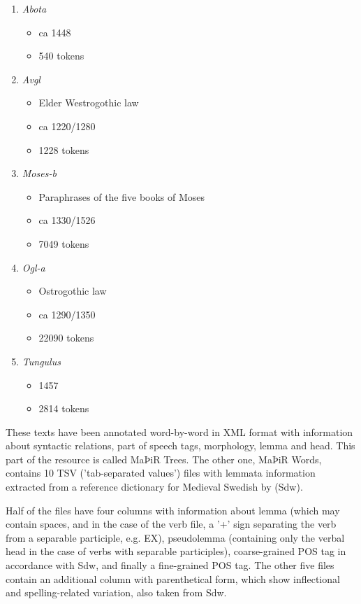 \documentclass[11pt,a4paper]{article}
\begin{document}
\begin{enumerate}
   \item \emph{Abota}
   \begin{itemize}
     \item ca 1448
     \item 540 tokens
   \end{itemize}
   \item \emph{Avgl} 
     \begin{itemize}
     \item Elder Westrogothic law
     \item ca 1220/1280
     \item 1228 tokens
   \end{itemize}
    \item \emph{Moses-b} 
     \begin{itemize}
     \item Paraphrases of the five books of Moses 
     \item ca 1330/1526
     \item 7049 tokens
   \end{itemize}
    \item \emph{Ogl-a} 
     \begin{itemize}
     \item Ostrogothic law
     \item ca 1290/1350
     \item 22090 tokens
   \end{itemize}
   \item \emph{Tungulus} 
     \begin{itemize}
     \item 1457
     \item 2814 tokens
   \end{itemize}
\end{enumerate}

These texts have been annotated word-by-word in XML format with information about syntactic relations, part of speech tags, morphology, lemma and head. This part of the resource is called MaÞiR Trees. The other one, MaÞiR Words, contains 10 TSV ('tab-separated values') files with lemmata information extracted from a reference dictionary for Medieval Swedish by \citet{soderwall:1891-1918} (Sdw). 

Half of the files have four columns with information about lemma (which may contain spaces, and in the case of the verb file, a '+' sign separating the verb from a separable participle, e.g. EX), pseudolemma (containing only the verbal head in the case of verbs with separable participles), coarse-grained POS tag in accordance with Sdw, and finally a fine-grained POS tag. The other five files contain an additional column with parenthetical form, which show inflectional and spelling-related variation, also taken from Sdw.    
\end{document}
